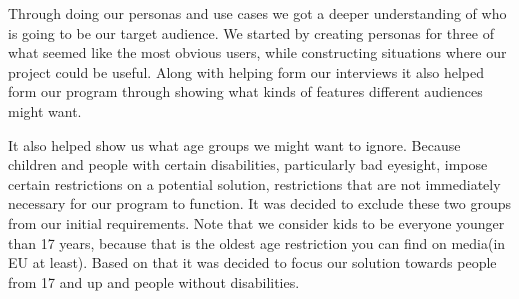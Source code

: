 Through doing our personas and use cases we got a deeper understanding of who is going to be our target audience. We started by creating personas for three of what seemed like the most obvious users, while constructing situations where our project could be useful. Along with helping form our interviews it also helped form our program through showing what kinds of features different audiences might want.

It also helped show us what age groups we might want to ignore. Because children and people with certain disabilities, particularly bad eyesight, impose certain restrictions on a potential solution, restrictions that are not immediately necessary for our program to function. It was decided to exclude these two groups from our initial requirements. Note that we consider kids to be everyone younger than 17 years, because that is the oldest age restriction you can find on media(in EU at least). Based on that it was decided to focus our solution towards people from 17 and up and people without disabilities.